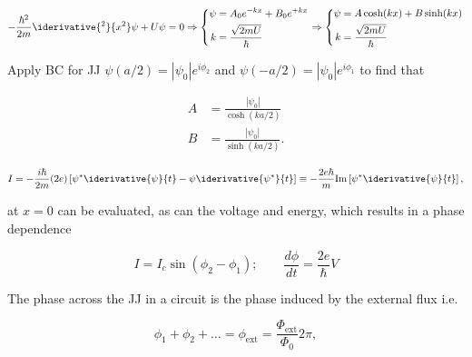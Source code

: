   \begin{equation}
    -\frac{\hbar^2}{2m}\iderivative{^2}{x^2}\psi+U\psi = 0 \Rightarrow
    \left\lbrace\begin{aligned}
        \psi & = A_0e^{-kx}+B_0e^{+kx}\\
        k & = \frac{\sqrt{2mU}}{\hbar}
      \end{aligned} \right. \Rightarrow \left\lbrace\begin{aligned}
        \psi & = A\cosh(kx)+B\sinh(kx)\\
        k & = \frac{\sqrt{2mU}}{\hbar}
      \end{aligned} \right.
  \end{equation}
  
  \noindent    Apply     BC    for     JJ    $\psi(a/2)    =     \left|\psi_0\right|e^{i\phi_2}$    and
  $\psi(-a/2) = \left|\psi_0\right|e^{i\phi_1}$ to find that
  
  \begin{align}
    A &= \frac{\left|\psi_0\right|}{\cosh(ka/2)}\\
    B &= \frac{\left|\psi_0\right|}{\sinh(ka/2)}.
  \end{align}
  
  
  \begin{equation}
    I = -\frac{i\hbar}{2m}(2e)\left[\psi^*\iderivative{\psi}{t}-\psi\iderivative{\psi^*}{t}\right] \equiv -\frac{2e\hbar}{m}\text{Im}\left[\psi^*\iderivative{\psi}{t}\right],
  \end{equation}
  
  \noindent at $x=0$ can be evaluated, as can the voltage and energy, which results in a phase
  dependence
  
  \begin{equation}
    \label{l2-dcac}
    I = I_c\sin(\phi_2-\phi_1); \qquad \frac{d\phi}{dt} = \frac{2e}{\hbar}V
  \end{equation}
  
  The phase across the JJ in a circuit is the phase induced by the external flux i.e.
  
  \begin{equation}
    \label{eqn:l2-phasesum}
    \phi_1+\phi_2+\ldots = \phi_\text{ext} = \frac{\Phi_\text{ext}}{\Phi_0}2\pi,
  \end{equation}
  
